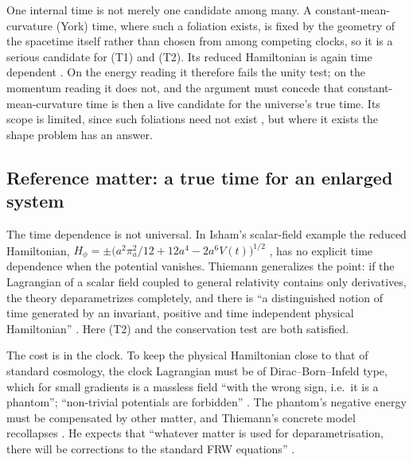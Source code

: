 \documentclass[11pt]{article}
\begin{document}
One internal time is not merely one candidate among many. A constant-mean-curvature
(York) time, where such a foliation exists, is fixed by the geometry of the
spacetime itself rather than chosen from among competing clocks, so it is a
serious candidate for (T1) and (T2). Its reduced Hamiltonian is again time
dependent \citep[p.~274]{Wuthrich2010}. On the energy reading it therefore fails
the unity test; on the momentum reading it does not, and the argument must concede
that constant-mean-curvature time is then a live candidate for the universe's true
time. Its scope is limited, since such foliations need not exist
\citep[pp.~269--275]{Wuthrich2010}, but where it exists the shape problem has an
answer.

\subsection{Reference matter: a true time for an enlarged system}\label{sec:reference}

The time dependence is not universal. In Isham's scalar-field example the
reduced Hamiltonian,
$H_\phi=\pm\bigl(a^2\pi_a^2/12+12a^4-2a^6V(t)\bigr)^{1/2}$
\citep[eq.~5.2.8]{Isham1991}, has no explicit time dependence when the potential
vanishes. Thiemann generalizes the point: if the Lagrangian of a scalar field
coupled to general relativity contains only derivatives, the theory
deparametrizes completely, and there is ``a distinguished notion of time
generated by an invariant, positive and time independent physical
Hamiltonian'' \citep[p.~20]{Thiemann2006}. Here (T2) and the conservation test
are both satisfied.

The cost is in the clock. To keep the physical Hamiltonian close to that of
standard cosmology, the clock Lagrangian must be of Dirac--Born--Infeld type,
which for small gradients is a massless field ``with the wrong sign, i.e.\ it is a
phantom''; ``non-trivial potentials are forbidden'' \citep[p.~5]{Thiemann2006}.
The phantom's negative energy must be compensated by other matter, and
Thiemann's concrete model recollapses \citep[pp.~9--10]{Thiemann2006}. He
expects that ``whatever matter is used for deparametrisation, there will be
corrections to the standard FRW equations'' \citep[p.~9]{Thiemann2006}.
\end{document}
